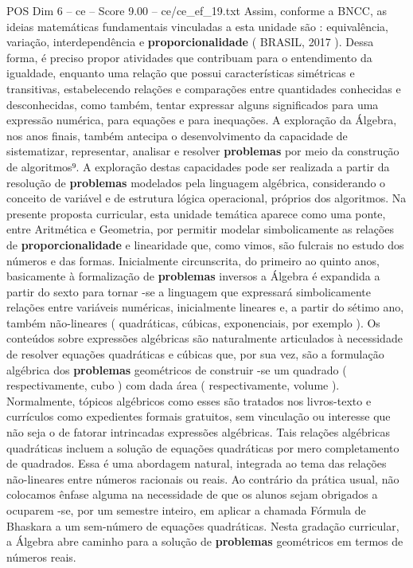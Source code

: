 \begin{textsample}{POS Dim 6 – ce – Score 9.00 – ce/ce\_ef\_19.txt}
Assim, conforme a BNCC, as ideias matemáticas fundamentais vinculadas a esta unidade são : equivalência, variação, interdependência e \textbf{proporcionalidade} ( BRASIL, 2017 ).
Dessa forma, é preciso propor atividades que contribuam para o entendimento da igualdade, enquanto uma relação que possui características simétricas e transitivas, estabelecendo relações e comparações entre quantidades conhecidas e desconhecidas, como também, tentar expressar alguns significados para uma expressão numérica, para equações e para inequações.
A exploração da Álgebra, nos anos finais, também antecipa o desenvolvimento da capacidade de sistematizar, representar, analisar e resolver \textbf{problemas} por meio da construção de algoritmos⁹.
A exploração destas capacidades pode ser realizada a partir da resolução de \textbf{problemas} modelados pela linguagem algébrica, considerando o conceito de variável e de estrutura lógica operacional, próprios dos algoritmos.
Na presente proposta curricular, esta unidade temática aparece como uma ponte, entre Aritmética e Geometria, por permitir modelar simbolicamente as relações de \textbf{proporcionalidade} e linearidade que, como vimos, são fulcrais no estudo dos números e das formas.
Inicialmente circunscrita, do primeiro ao quinto anos, basicamente à formalização de \textbf{problemas} inversos a Álgebra é expandida a partir do sexto para tornar -se a linguagem que expressará simbolicamente relações entre variáveis numéricas, inicialmente lineares e, a partir do sétimo ano, também não-lineares ( quadráticas, cúbicas, exponenciais, por exemplo ).
Os conteúdos sobre expressões algébricas são naturalmente articulados à necessidade de resolver equações quadráticas e cúbicas que, por sua vez, são a formulação algébrica dos \textbf{problemas} geométricos de construir -se um quadrado ( respectivamente, cubo ) com dada área ( respectivamente, volume ).
Normalmente, tópicos algébricos como esses são tratados nos livros-texto e currículos como expedientes formais gratuitos, sem vinculação ou interesse que não seja o de fatorar intrincadas expressões algébricas.
Tais relações algébricas quadráticas incluem a solução de equações quadráticas por mero completamento de quadrados.
Essa é uma abordagem natural, integrada ao tema das relações não-lineares entre números racionais ou reais.
Ao contrário da prática usual, não colocamos ênfase alguma na necessidade de que os alunos sejam obrigados a ocuparem -se, por um semestre inteiro, em aplicar a chamada Fórmula de Bhaskara a um sem-número de equações quadráticas.
Nesta gradação curricular, a Álgebra abre caminho para a solução de \textbf{problemas} geométricos em termos de números reais.

\end{textsample}
